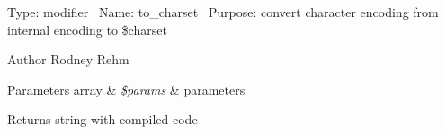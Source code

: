 Type\+: modifier~\newline
 Name\+: to\+\_\+charset~\newline
 Purpose\+: convert character encoding from internal encoding to \$charset

\begin{DoxyAuthor}{Author}
Rodney Rehm 
\end{DoxyAuthor}

\begin{DoxyParams}[1]{Parameters}
array & {\em \$params} & parameters \\
\hline
\end{DoxyParams}
\begin{DoxyReturn}{Returns}
string with compiled code 
\end{DoxyReturn}
